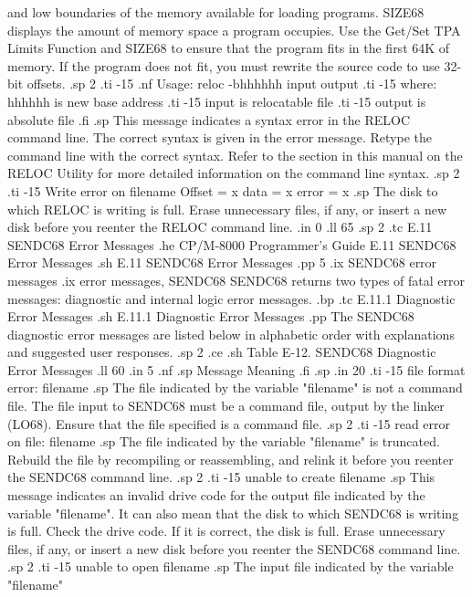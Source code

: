and low boundaries of the memory available for loading programs.  SIZE68
displays the amount of memory space a program occupies.  Use the 
Get/Set TPA Limits Function and SIZE68 to ensure that the program 
fits in the first 64K of memory.  If the program does not fit, you 
must rewrite the source code to use 32-bit offsets. 
.sp 2
.ti -15
.nf
Usage: reloc -bhhhhhh input output
.ti -15
       where:  hhhhhh is new base address
.ti -15
               input is relocatable file
.ti -15
               output is absolute file
.fi
.sp
This message indicates a syntax error in the RELOC command line.
The correct syntax is given in the error message.  Retype the command line 
with the correct syntax.  Refer to the section in this manual on
the RELOC Utility for more detailed information on the command line syntax.
.sp 2
.ti -15
Write error on filename   Offset = x  data = x  error = x
.sp
The disk to which RELOC is writing is full.  Erase unnecessary files, if any, 
or insert a new disk before you reenter the RELOC command line.	
.in 0
.ll 65
.sp 2
.tc    E.11 SENDC68 Error Messages
.he CP/M-8000 Programmer's Guide          E.11  SENDC68 Error Messages
.sh
E.11  SENDC68 Error Messages
.pp 5
.ix SENDC68 error messages
.ix error messages, SENDC68
SENDC68 returns two types of fatal error messages:  diagnostic and internal 
logic error messages.  
.bp
.tc         E.11.1  Diagnostic Error Messages
.sh
E.11.1  Diagnostic Error Messages
.pp
The SENDC68 diagnostic error messages are listed below in alphabetic order 
with explanations and suggested user responses.
.sp 2
.ce
.sh
Table E-12.  SENDC68 Diagnostic Error Messages
.ll 60
.in 5
.nf
.sp
Message        Meaning
.fi
.sp
.in 20
.ti -15
file format error:  filename
.sp
The file indicated by the variable "filename" is not a command file.
The file input to SENDC68 must be a command file, output by the linker 
(LO68).  Ensure that the file specified is a command file.
.sp 2
.ti -15
read error on file:  filename
.sp
The file indicated by the variable "filename" is truncated.  Rebuild the file 
by recompiling or reassembling, and relink it before you reenter the SENDC68 
command line.
.sp 2
.ti -15
unable to create filename
.sp
This message indicates an invalid drive code for the 
output file indicated by the variable "filename".  It can also mean that the
disk to which SENDC68 is writing is full.  Check the drive code.  If it is 
correct, the disk is full.
Erase unnecessary files, if any, or insert a new disk before you reenter the
SENDC68 command line.
.sp 2
.ti -15
unable to open filename
.sp
The input file indicated by the variable "filename" 
